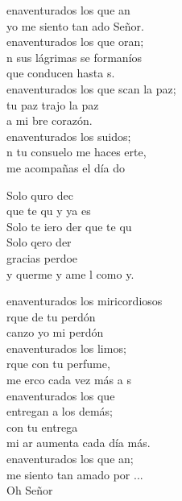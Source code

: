 \begin{cancion}%
	enaventurados los que an\\
	yo me siento tan ado Señor.\\
	enaventurados los que oran;\\
	n sus lágrimas se formaníos\\
	que conducen hasta s.   \\
	enaventurados los que scan la paz;\\
	tu paz trajo la paz\\
	a mi bre corazón.\\
	enaventurados los suidos;\\
	n tu consuelo me haces erte,\\
	me acompañas el día do \\
	\begin{chorus}%
	Solo quro dec\\
	que te qu y ya es\\
	Solo te iero der que te qu \\
	Solo qero der\\
	gracias perdoe\\
	y querme y ame l como y.\\
	\end{chorus}%
	enaventurados los miricordiosos\\
	rque de tu perdón \\
	canzo yo mi perdón\\
	enaventurados los limos;\\
	rque con tu perfume,\\
	me erco cada vez más a s \\
	enaventurados los que \\
	 entregan a los demás;\\
	con tu entrega \\
	mi ar aumenta cada día más.\\
	enaventurados los que an;\\
	 me siento tan amado por ...\\
	Oh Señor  \\
\end{cancion}%
